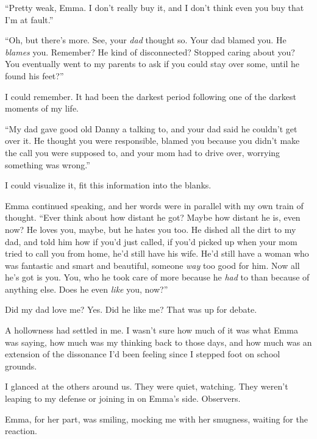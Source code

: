 ``Pretty weak, Emma.  I don't really buy it, and I don't think even you buy that I'm at fault.''



``Oh, but there's more.  See, your \emph{dad} thought so.  Your dad blamed you.  He \emph{blames} you. Remember?  He kind of disconnected?  Stopped caring about you?  You eventually went to my parents to ask if you could stay over some, until he found his feet?''



I could remember.  It had been the darkest period following one of the darkest moments of my life.



``My dad gave good old Danny a talking to, and your dad said he couldn't get over it.  He thought you were responsible, blamed you because you didn't make the call you were supposed to, and your mom had to drive over, worrying something was wrong.''



I could visualize it, fit this information into the blanks.



Emma continued speaking, and her words were in parallel with my own train of thought.  ``Ever think about how distant he got?  Maybe how distant he is, even now?  He loves you, maybe, but he hates you too.  He dished all the dirt to my dad, and told him how if you'd just called, if you'd picked up when your mom tried to call you from home, he'd still have his wife.  He'd still have a woman who was fantastic and smart and beautiful, someone \emph{way }too good for him.  Now all he's got is you.  You, who he took care of more because he \emph{had} to than because of anything else.  Does he even \emph{like} you, now?''



Did my dad love me?  Yes.  Did he like me?  That was up for debate.



A hollowness had settled in me.  I wasn't sure how much of it was what Emma was saying, how much was my thinking back to those days, and how much was an extension of the dissonance I'd been feeling since I stepped foot on school grounds.



I glanced at the others around us.  They were quiet, watching.  They weren't leaping to my defense or joining in on Emma's side.  Observers.



Emma, for her part, was smiling, mocking me with her smugness, waiting for the reaction.



